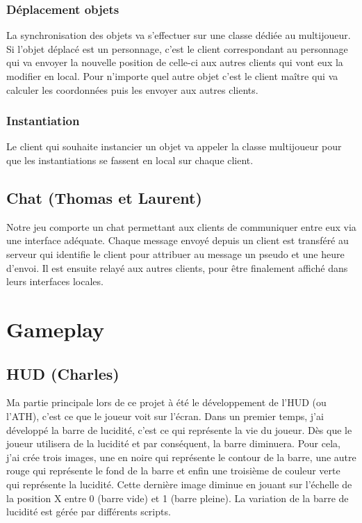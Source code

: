 \documentclass[a4paper , 12pt]{article}
\begin{document}
	\subsubsection{Déplacement objets}

	\quad

La synchronisation des objets va s’effectuer sur une classe dédiée au multijoueur. Si l’objet déplacé est un personnage, c’est le client correspondant au personnage qui va envoyer la nouvelle position de celle-ci aux autres clients qui vont eux la modifier en local. Pour n’importe quel autre objet c’est le client maître qui va calculer les coordonnées puis les envoyer aux autres clients.

\quad


	\subsubsection{Instantiation}

	\quad

Le client qui souhaite instancier un objet va appeler la classe multijoueur pour que les instantiations se fassent en local sur chaque client.
\quad

	\subsection{Chat (Thomas et Laurent)}

	\quad

Notre jeu comporte un chat permettant aux clients de communiquer entre eux via une interface adéquate. Chaque message envoyé depuis un client est transféré au serveur qui identifie le client pour attribuer au message un pseudo et une heure d’envoi. Il est ensuite relayé aux autres clients, pour être finalement affiché dans leurs interfaces locales.



\quad

\newpage

\section{Gameplay}

	\subsection{HUD (Charles)}

	\quad

Ma partie principale lors de ce projet à été le développement de l'HUD (ou l'ATH), c'est ce que le joueur voit sur l'écran. Dans un premier temps, j'ai développé la barre de lucidité, c'est ce qui représente la vie du joueur. Dès que le joueur utilisera de la lucidité et par conséquent, la barre diminuera. Pour cela, j'ai crée trois images, une en noire qui représente le contour de la barre, une autre rouge qui représente le fond de la barre et enfin une troisième de couleur verte qui représente la lucidité. Cette dernière image diminue en jouant sur l'échelle de la position X entre 0 (barre vide) et 1 (barre pleine). La variation de la barre de lucidité est gérée par différents scripts.\\
\end{document}
